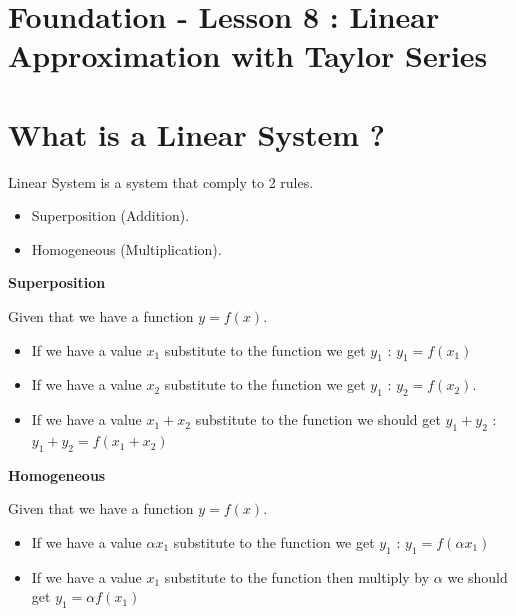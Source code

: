 \documentclass[12pt,a4paper]{article}
\begin{document}
	\section*{\centering Foundation - Lesson 8 : Linear Approximation with Taylor Series}
	
	
	\section{What is a Linear System ?}
	Linear System is a system that comply to 2 rules.
	\begin{itemize}
		\item Superposition (Addition).
		\item Homogeneous (Multiplication). 
	\end{itemize}
	
	\begin{center}
		\textbf{Superposition}
	\end{center}
	
	Given that we have a function \(y = f(x)\).
	\begin{itemize}
		\item If we have a value \(x_1\) substitute to the function we get \(y_1\) : \(y_1 = f(x_1)\)
		\item If we have a value \(x_2\) substitute to the function we get \(y_1\) : \(y_2 = f(x_2)\).
		\item If we have a value \(x_1 + x_2\) substitute to the function we should get \(y_1+y_2\) : \(y_1+y_2 = f(x_1+x_2)\)
	\end{itemize}
	
	\begin{center}
		\textbf{Homogeneous}
	\end{center}
	
	Given that we have a function \(y = f(x)\).
	\begin{itemize}
		\item If we have a value \(\alpha x_1\) substitute to the function we get \(y_1\) : \(y_1 = f(\alpha x_1)\)
		\item If we have a value \(x_1\) substitute to the function then multiply by \(\alpha\) we should get \(y_1 = \alpha f(x_1)\)
	\end{itemize}
	
\end{document}

